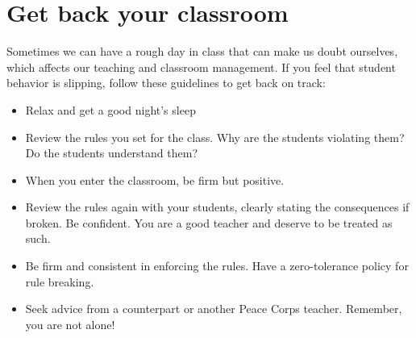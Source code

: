 \section{Get back your classroom}

Sometimes we can have a rough day in class that can make us doubt ourselves, which affects our teaching and classroom management.  If you feel that student behavior is slipping, follow these guidelines to get back on track:

\begin{itemize}
 \item Relax and get a good night's sleep
 \item Review the rules you set for the class.  Why are the students violating them?  Do the students understand them?
 \item When you enter the classroom, be firm but positive.
 \item Review the rules again with your students, clearly stating the consequences if broken.  Be confident.  You are a good teacher and deserve to be treated as such.
 \item Be firm and consistent in enforcing the rules.  Have a zero-tolerance policy for rule breaking.
 \item Seek advice from a counterpart or another Peace Corps teacher. Remember, you are not alone! 
\end{itemize}
